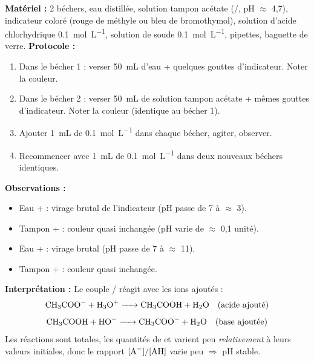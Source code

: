 \documentclass[11pt]{article}
\begin{document}
\begin{experience}
\textbf{Matériel :} 2 béchers, eau distillée, solution tampon acétate (/, pH $\approx$ 4,7), indicateur coloré (rouge de méthyle ou bleu de bromothymol), solution d'acide chlorhydrique \SI{0,1}{mol.L^{-1}}, solution de soude \SI{0,1}{mol.L^{-1}}, pipettes, baguette de verre.
\textbf{Protocole :}
\begin{enumerate}
  \item Dans le bécher 1 : verser \SI{50}{mL} d'eau + quelques gouttes d'indicateur. Noter la couleur.
  \item Dans le bécher 2 : verser \SI{50}{mL} de solution tampon acétate + mêmes gouttes d'indicateur. Noter la couleur (identique au bécher 1).
  \item Ajouter \SI{1}{mL} de  \SI{0,1}{mol.L^{-1}} dans chaque bécher, agiter, observer.
  \item Recommencer avec \SI{1}{mL} de  \SI{0,1}{mol.L^{-1}} dans deux nouveaux béchers identiques.
\end{enumerate}
\textbf{Observations :}
\begin{itemize}
  \item Eau +  : virage brutal de l'indicateur (pH passe de 7 à $\approx$ 3).
  \item Tampon +  : couleur quasi inchangée (pH varie de $\approx$ 0,1 unité).
  \item Eau +  : virage brutal (pH passe de 7 à $\approx$ 11).
  \item Tampon +  : couleur quasi inchangée.
\end{itemize}
\textbf{Interprétation :} Le couple / réagit avec les ions ajoutés :
\[ \ce{CH3COO- + H3O+ -> CH3COOH + H2O} \quad \text{(acide ajouté)} \]
\[ \ce{CH3COOH + HO- -> CH3COO- + H2O} \quad \text{(base ajoutée)} \]
Les réactions sont totales, les quantités de  et  varient peu \emph{relativement} à leurs valeurs initiales, donc le rapport $[\ce{A-}]/[\ce{AH}]$ varie peu $\Rightarrow$ pH stable.
\end{experience}
\end{document}
